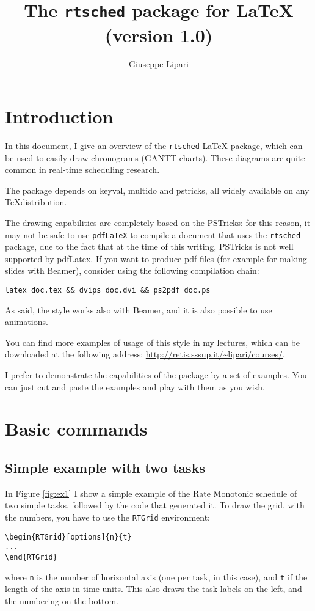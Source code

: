 \documentclass{article}
\title{The \texttt{rtsched} package for \LaTeX \\ (version 1.0)}
\author{Giuseppe Lipari}
\begin{document}
\maketitle

\listoffigures

\section{Introduction}

In this document, I give an overview of the \texttt{rtsched} \LaTeX
package, which can be used to easily draw chronograms (GANTT charts).
These diagrams are quite common in real-time scheduling research.

The package depends on keyval, multido and pstricks, all widely
available on any \TeX distribution.

The drawing capabilities are completely based on the PSTricks: for
this reason, it may not be safe to use \texttt{pdfLaTeX} to compile a
document that uses the \texttt{rtsched} package, due to the fact that
at the time of this writing, PSTricks is not well supported by
pdfLatex. If you want to produce pdf files (for example for making
slides with Beamer), consider using the following compilation chain:

\begin{verbatim}
latex doc.tex && dvips doc.dvi && ps2pdf doc.ps 
\end{verbatim}

As said, the style works also with Beamer, and it is also possible to
use animations.

You can find more examples of usage of this style in my lectures,
which can be downloaded at the following address:
\url{http://retis.sssup.it/~lipari/courses/}.

I prefer to demonstrate the capabilities of the package by a set of
examples. You can just cut and paste the examples and play with them
as you wish.

\section{Basic commands}

\subsection{Simple example with two tasks}

In Figure \ref{fig:ex1} I show a simple example of the Rate Monotonic
schedule of two simple tasks, followed by the code that generated it.
To draw the grid, with the numbers, you have to use the
\texttt{RTGrid} environment:
\begin{verbatim}
\begin{RTGrid}[options]{n}{t}
...
\end{RTGrid}
\end{verbatim}
\noindent where \texttt{n} is the number of horizontal axis (one per
task, in this case), and \texttt{t} if the length of the axis in time
units. This also draws the task labels on the left, and the numbering
on the bottom.
\end{document}
